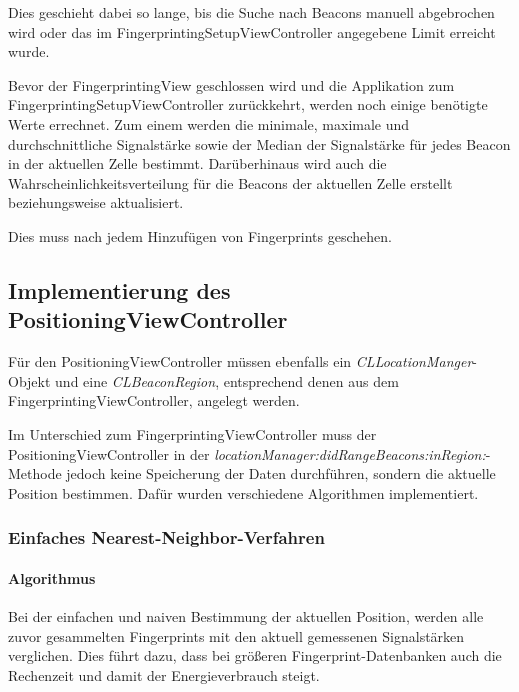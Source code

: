 Dies geschieht dabei so lange, bis die Suche nach Beacons manuell abgebrochen wird oder das im FingerprintingSetupViewController angegebene Limit erreicht wurde. 

Bevor der FingerprintingView geschlossen wird und die Applikation zum FingerprintingSetupViewController zurückkehrt, werden noch einige benötigte Werte errechnet.
Zum einem werden die minimale, maximale und durchschnittliche Signalstärke sowie der Median der Signalstärke für jedes Beacon in der aktuellen Zelle bestimmt. 
Darüberhinaus wird auch die Wahrscheinlichkeitsverteilung für die Beacons der aktuellen Zelle erstellt beziehungsweise aktualisiert.

Dies muss nach jedem Hinzufügen von Fingerprints geschehen.



\subsection{Implementierung des PositioningViewController}
\label{sec:}

Für den PositioningViewController müssen ebenfalls ein \emph{CLLocationManger}-Objekt und eine \emph{CLBeaconRegion}, entsprechend denen aus dem FingerprintingViewController, angelegt werden.

Im Unterschied zum FingerprintingViewController muss der PositioningViewController in der \emph{locationManager:didRangeBeacons:inRegion:}-Methode jedoch keine Speicherung der Daten durchführen, sondern die aktuelle Position bestimmen. Dafür wurden verschiedene Algorithmen implementiert.



\subsubsection{Einfaches Nearest-Neighbor-Verfahren}
\label{sec:}

\paragraph{Algorithmus}
\label{sec:}
Bei der einfachen und naiven Bestimmung der aktuellen Position, werden alle zuvor gesammelten Fingerprints mit den aktuell gemessenen Signalstärken verglichen. Dies führt dazu, dass bei größeren Fingerprint-Datenbanken auch die Rechenzeit und damit der Energieverbrauch steigt. 

